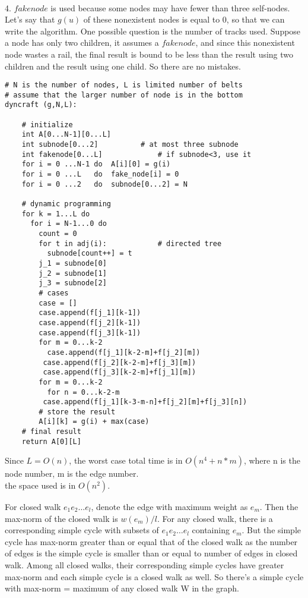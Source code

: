 \documentclass[12pt,a4paper]{article}
\newcommand{\question}[1]{\bigskip\noindent{\textbf{Q{#1} solution}}}
\begin{document}
\\4. $fakenode$ is used because some nodes may have fewer than three self-nodes. Let's say that $g(u)$ of these nonexistent nodes is equal to 0, so that we can write the algorithm. One possible question is the number of tracks used. Suppose a node has only two children, it assumes a $fakenode$, and since this nonexistent node wastes a rail, the final result is bound to be less than the result using two children and the result using one child. So there are no mistakes.\\
\begin{lstlisting}
# N is the number of nodes, L is limited number of belts
# assume that the larger number of node is in the bottom
dyncraft (g,N,L):  

	# initialize
	int A[0...N-1][0...L]
	int subnode[0...2]  		# at most three subnode
	int fakenode[0...L] 			# if subnode<3, use it
	for i = 0 ...N-1 do  A[i][0] = g(i)
	for i = 0 ...L 	 do  fake_node[i] = 0
	for i = 0 ...2 	 do  subnode[0...2] = N
	
	# dynamic programming
	for k = 1...L do
	  for i = N-1...0 do
	    count = 0
	    for t in adj(i):  			# directed tree
	      subnode[count++] = t
	    j_1 = subnode[0]
	    j_2 = subnode[1]
	    j_3 = subnode[2]
	    # cases
	    case = []
	    case.append(f[j_1][k-1])
	    case.append(f[j_2][k-1])
	    case.append(f[j_3][k-1])
	    for m = 0...k-2
	      case.append(f[j_1][k-2-m]+f[j_2][m]) 
		 case.append(f[j_2][k-2-m]+f[j_3][m])
		 case.append(f[j_3][k-2-m]+f[j_1][m])
	    for m = 0...k-2
	      for n = 0...k-2-m
		 case.append(f[j_1][k-3-m-n]+f[j_2][m]+f[j_3][n])
	    # store the result
	    A[i][k] = g(i) + max(case)
	# final result
	return A[0][L]

\end{lstlisting}
Since $L = O(n)$, the worst case total time is in $O(n^4 + n*m)$, where n is the node number, m is the edge number.\\
the space used is in $O(n^2)$.\\


\question{27.A}

For closed walk $e_1e_2\dots e_l$, denote the edge with maximum weight as $e_m$. Then the max-norm of the closed walk is $w(e_m)/l$. For any closed walk, there is a corresponding simple cycle with subsets of $e_1e_2\dots e_l$ containing $e_m$. But the simple cycle has max-norm greater than or equal that of the closed walk as the number of edges is the simple cycle is smaller than or equal to number of edges in closed walk. Among all closed walks, their corresponding simple cycles have greater max-norm and each simple cycle is a closed walk as well. So there's a simple cycle with max-norm = maximum of any closed walk W in the graph.

\question{27.B}
\end{document}
